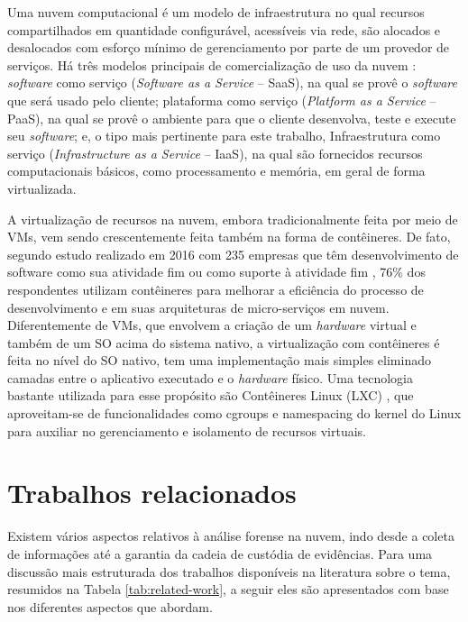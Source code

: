 \documentclass[conference]{IEEEtran}
\begin{document}
Uma nuvem computacional é um modelo de infraestrutura no qual recursos compartilhados em quantidade configurável, acessíveis via rede, são alocados e desalocados com esforço mínimo de gerenciamento por parte de um provedor de serviços. \cite{NIST2011}
%
Há três modelos principais de comercialização de uso da nuvem \cite{NIST2011}: \textit{software} como serviço (\textit{Software as a Service} -- SaaS), na qual se provê o \textit{software} que será usado pelo cliente; plataforma como serviço (\textit{Platform as a Service} -- PaaS), na qual se provê o ambiente para que o cliente desenvolva, teste e execute seu \textit{software}; e, o tipo mais pertinente para este trabalho, Infraestrutura como serviço (\textit{Infrastructure as a Service} -- IaaS), na qual são fornecidos recursos computacionais básicos, como processamento e memória, em geral de forma virtualizada.


A virtualização de recursos na nuvem, embora tradicionalmente feita por meio de VMs, vem sendo crescentemente feita também na forma de contêineres.
%
De fato, segundo estudo realizado em 2016 com 235 empresas que têm desenvolvimento de software como sua atividade fim ou como suporte à atividade fim \cite{container-survey:2016}, 76\% dos respondentes utilizam contêineres para melhorar a eficiência do processo de desenvolvimento e em suas arquiteturas de micro-serviços em nuvem.
%
Diferentemente de VMs, que envolvem a criação de um \textit{hardware} virtual e também de um SO acima do sistema nativo, a virtualização com contêineres é feita no nível do SO nativo, tem uma implementação mais simples eliminado camadas entre o aplicativo executado e o \textit{hardware} físico.
%
Uma tecnologia bastante utilizada para esse propósito são Contêineres Linux (LXC)%
, que aproveitam-se de funcionalidades como cgroups e namespacing do kernel do Linux para auxiliar no gerenciamento e isolamento de recursos virtuais.



\section{Trabalhos relacionados}
\label{sec:related}

Existem vários aspectos relativos à análise forense na nuvem, indo desde a coleta de informações até a garantia da cadeia de custódia de evidências.
%
Para uma discussão mais estruturada dos trabalhos disponíveis na literatura sobre o tema, resumidos na Tabela \ref{tab:related-work}, a seguir eles são apresentados com base nos diferentes aspectos que abordam.
\end{document}

